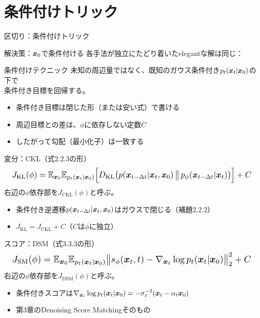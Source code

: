 \section{条件付けトリック}
\asmain
\begin{frame}{区切り：条件付けトリック}
    \tableofcontents[currentsection]
\end{frame}
\asmain
\begin{frame}{解決策：$\bm{x}_0$で条件付ける}
    各手法が独立にたどり着いたelegantな解は同じ：
    \begin{block}{条件付けテクニック}
        未知の周辺量ではなく、既知のガウス条件付き$p_t(\bm{x}_t|\bm{x}_0)$の下で\\
        条件付き目標を回帰する。
    \end{block}
    \begin{itemize}
        \item 条件付き目標は閉じた形（または安い式）で書ける
        \item 周辺目標との差は、$\phi$に依存しない定数$C$
        \item したがって勾配（最小化子）は一致する
    \end{itemize}
\end{frame}
\asmain
\begin{frame}{変分：CKL（式2.2.3の形）}
    \[
        \resizebox{0.98\textwidth}{!}{$
        J_{\mathrm{KL}}(\phi)
        =
        \mathbb{E}_{\vx_0}
        \mathbb{E}_{p_t(\vx_t|\vx_0)}
        \Bigl[
        D_{\mathrm{KL}}
        \bigl(
        p(\vx_{t-\Delta t}|\vx_t,\vx_0)
        \,\big\|\,
        p_\phi(\vx_{t-\Delta t}|\vx_t)
        \bigr)
        \Bigr]
        +C
        $}
    \]
    右辺の$\phi$依存部を$J_{\mathrm{CKL}}(\phi)$と呼ぶ。
    \begin{itemize}
        \item 条件付き逆遷移$p(\bm{x}_{t-\Delta t}|\bm{x}_t,\bm{x}_0)$はガウスで閉じる（補題2.2.2）
        \item $J_{\mathrm{KL}}=J_{\mathrm{CKL}}+C$（$C$は$\phi$に独立）
    \end{itemize}
\end{frame}
\asmain
\begin{frame}{スコア：DSM（式3.3.3の形）}
    \[
        \resizebox{0.98\textwidth}{!}{$
        J_{\mathrm{SM}}(\phi)
        =
        \mathbb{E}_{\vx_0}
        \mathbb{E}_{p_t(\vx_t|\vx_0)}
        \bigl\|
        s_\phi(\vx_t,t)
        -
        \nabla_{\vx_t}\log p_t(\vx_t|\vx_0)
        \bigr\|_{2}^{2}
        +C
        $}
    \]
    右辺の$\phi$依存部を$J_{\mathrm{DSM}}(\phi)$と呼ぶ。
    \begin{itemize}
        \item 条件付きスコアは$\nabla_{\bm{x}_t}\log p_t(\bm{x}_t|\bm{x}_0)=-\sigma_t^{-2}(\bm{x}_t-\alpha_t\bm{x}_0)$
        \item 第3章のDenoising Score Matchingそのもの
    \end{itemize}
\end{frame}

